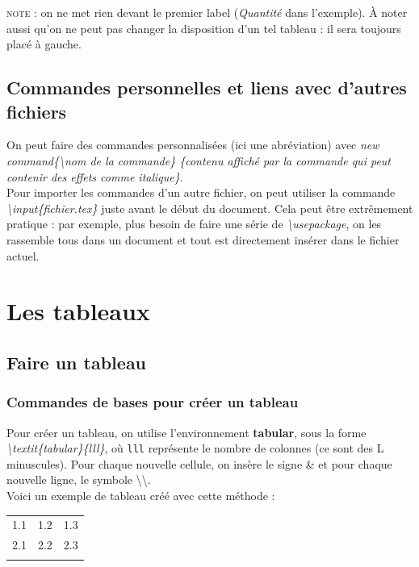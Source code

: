 \documentclass[a4paper, 10pt]{book}
\begin{document}
\textsc{note :} on ne met rien devant le premier label (\textit{Quantité} dans l'exemple). À noter aussi qu'on ne peut pas changer la disposition d'un tel tableau : il sera toujours placé à gauche.

\section{Commandes personnelles et liens avec d'autres fichiers} 

On peut faire des commandes personnalisées (ici une abréviation) avec \textit{new command\{\textbackslash nom de la commande\} \{contenu affiché par la commande qui peut contenir des effets comme italique\}}.\\
Pour importer les commandes d'un autre fichier, on peut utiliser la commande \textit{\textbackslash input\{fichier.tex\}} juste avant le début du document. Cela peut être extrêmement pratique : par exemple, plus besoin de faire une série de \textit{\textbackslash usepackage}, on les rassemble tous dans un document et tout est directement insérer dans le fichier actuel. 

\chapter{Les tableaux}
\section{Faire un tableau}
\subsection{Commandes de bases pour créer un tableau}

Pour créer un tableau, on utilise l'environnement \textbf{tabular}, sous la forme \textit{\textbackslash textit\{tabular\}\{lll\}}, où \texttt{lll} représente le nombre de colonnes (ce sont des L minuscules). Pour chaque nouvelle cellule, on insère le signe \textsf{\&} et pour chaque nouvelle ligne, le symbole \textsf{\textbackslash \textbackslash}. \\ Voici un exemple de tableau créé avec cette méthode :\\

\begin{tabular}{lll}
1.1 & 1.2 & 1.3\\
2.1 & 2.2 & 2.3\\ \\
\end{tabular}
\end{document}
